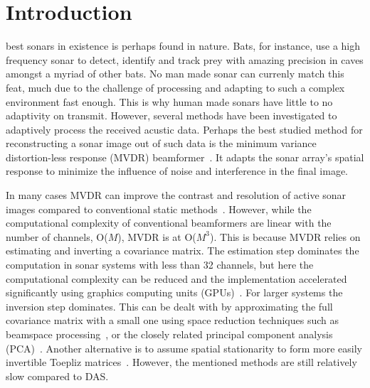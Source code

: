 \maketitle

\IEEEdisplaynotcompsoctitleabstractindextext


\IEEEpeerreviewmaketitle

\section{Introduction}


 best sonars in existence is perhaps found in nature. Bats, for instance, use a high frequency sonar to detect, identify and track prey with amazing precision in caves amongst a myriad of other bats. No man made sonar can currenly match this feat, much due to the challenge of processing and adapting to such a complex environment fast enough. This is why human made sonars have little to no adaptivity on transmit. However, several methods have been investigated to adaptively process the received acustic data. Perhaps the best studied method for reconstructing a sonar image out of such data is the minimum variance distortion-less response (MVDR) beamformer~\cite{Capon1969}. It adapts the sonar array's spatial response to minimize the influence of noise and interference in the final image.

In many cases MVDR can improve the contrast and resolution of active sonar images compared to conventional static methods~\cite{Blomberg2013,Blomberg2012a,Lo2004}. However, while the computational complexity of conventional beamformers are linear with the number of channels, O($M$), MVDR is at O($M^3$). This is because MVDR relies on estimating and inverting a covariance matrix. The estimation step dominates the computation in sonar systems with less than 32 channels, but here the computational complexity can be reduced and the implementation accelerated significantly using graphics computing units (GPUs)~\cite{Buskenes2014}. For larger systems the inversion step dominates. This can be dealt with by approximating the full covariance matrix with a small one using space reduction techniques such as beamspace processing~\cite{Asen2013}, or the closely related principal component analysis (PCA)~\cite{Kim2014}. Another alternative is to assume spatial stationarity to form more easily invertible Toepliz matrices~\cite{Asl2012}. However, the mentioned methods are still relatively slow compared to DAS.

